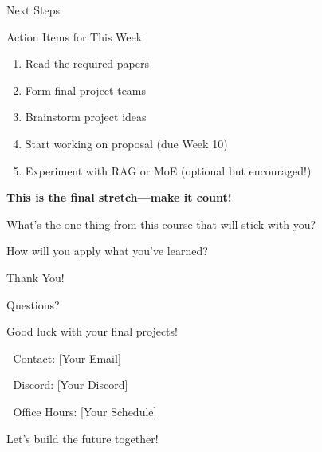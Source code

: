 \documentclass[aspectratio=169]{beamer}
\begin{document}
\begin{frame}{Next Steps 🚀}
\begin{alertblock}{Action Items for This Week}
\begin{enumerate}\setlength{\itemsep}{0pt}
    \item Read the required papers
    \item Form final project teams
    \item Brainstorm project ideas
    \item Start working on proposal (due Week 10)
    \item Experiment with RAG or MoE (optional but encouraged!)
\end{enumerate}
\end{alertblock}

\vspace{1em}

\begin{center}
\Large
\textbf{This is the final stretch—make it count!}
\end{center}

\vspace{0.5em}

\begin{thinkbox}
What's the one thing from this course that will stick with you?

How will you apply what you've learned?
\end{thinkbox}
\end{frame}

\begin{frame}{Thank You! 🎉}
\begin{center}
\Huge
Questions?

\vspace{2cm}

\Large
Good luck with your final projects!

\vspace{0.5cm}

\normalsize
📧 Contact: [Your Email]

💬 Discord: [Your Discord]

🏢 Office Hours: [Your Schedule]

\vspace{0.5cm}

\large
Let's build the future together! 🚀
\end{center}
\end{frame}
\end{document}
